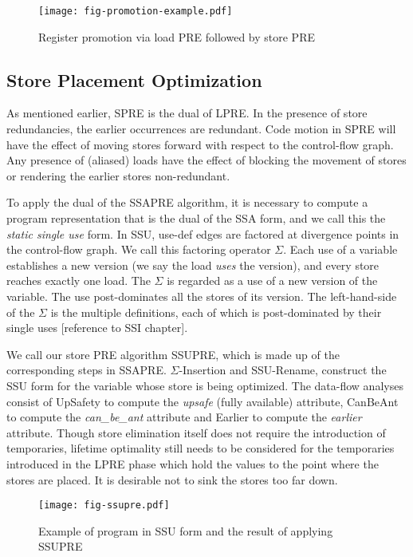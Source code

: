 \begin{figure}
\centering
\texttt{[image: fig-promotion-example.pdf]}
\caption{Register promotion via load PRE followed by store PRE}
\label{fig:promotion-example}
\end{figure}

\subsection{Store Placement Optimization}

As mentioned earlier, SPRE is the dual of LPRE.
In the presence of store redundancies, the earlier occurrences are redundant.
Code motion in SPRE will have the effect of moving stores forward with respect 
to the control-flow graph.  Any presence of (aliased) loads have the effect of
blocking the movement of stores or rendering the earlier stores non-redundant.

To apply the dual of the SSAPRE algorithm, it is necessary to compute a program
representation that is the dual of the SSA form, and we call this the 
\emph{static single use} form.  In SSU, use-def edges are factored at
divergence points in the control-flow graph.  We call this factoring operator
$\Sigma$.  Each use of a variable establishes a new version (we say the load 
\emph{uses} the version), and every store reaches exactly one load.   The
$\Sigma$ is regarded as a use of a new version of the variable.  The use
post-dominates all the stores of its version.  The left-hand-side of the
$\Sigma$ is the multiple definitions, each of which is post-dominated by their
single uses [reference to SSI chapter].

We call our store PRE algorithm SSUPRE, which is made up of the corresponding 
steps in SSAPRE.   $\Sigma$-Insertion and
SSU-Rename, construct the SSU form for the variable whose store is being 
optimized.  The data-flow analyses consist of UpSafety to compute the
\emph{upsafe} (fully available) attribute, CanBeAnt to compute the
\emph{can\_be\_ant} attribute and Earlier to compute the \emph{earlier}
attribute.  Though store elimination itself does not require
the introduction of temporaries, lifetime optimality still needs to be
considered for the temporaries introduced in the LPRE phase which hold the 
values to the point where the stores are placed.  It is desirable not 
to sink the stores too far down.  

\begin{figure}
\centering
\texttt{[image: fig-ssupre.pdf]}
\caption{Example of program in SSU form and the result of applying SSUPRE}
\label{fig:ssupre}
\end{figure}

